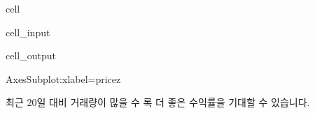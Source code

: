 \documentclass[letterpaper,10pt,english]{jupyterBook}
\begin{document}
\begin{sphinxuseclass}{cell}\begin{sphinxVerbatimInput}

\begin{sphinxuseclass}{cell_input}
\begin{sphinxVerbatim}[commandchars=\\\{\}]
  \PYG{p}{[}\PYG{p}{]}  
\PYG{p}{[}\PYG{p}{]}
\end{sphinxVerbatim}

\end{sphinxuseclass}\end{sphinxVerbatimInput}
\begin{sphinxVerbatimOutput}

\begin{sphinxuseclass}{cell_output}
\begin{sphinxVerbatim}[commandchars=\\\{\}]
\PYGZlt{}AxesSubplot:xlabel=\PYGZsq{}price\PYGZus{}z\PYGZsq{}\PYGZgt{}
\end{sphinxVerbatim}

\noindent{}

\end{sphinxuseclass}\end{sphinxVerbatimOutput}

\end{sphinxuseclass}
\sphinxAtStartPar
최근 20일 대비 거래량이 많을 수 록 더 좋은 수익률을 기대할 수 있습니다.
\end{document}
